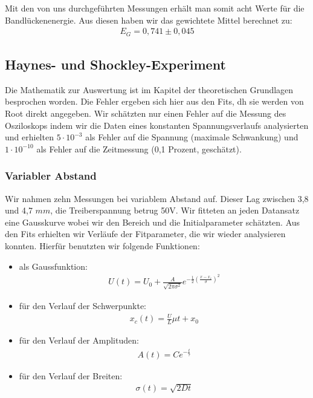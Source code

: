 \documentclass[12pt]{article}
\begin{document}
Mit den von uns durchgeführten Messungen erhält man somit acht Werte für die Bandlückenenergie. Aus diesen haben wir das gewichtete Mittel berechnet zu:
\begin{align*}
 E_G = 0,741 \pm 0,045
\end{align*}

\subsection{Haynes- und Shockley-Experiment}
\captionfont\footnotesize
Die Mathematik zur Auswertung ist im Kapitel der theoretischen Grundlagen besprochen worden. Die Fehler ergeben sich hier aus den Fits, dh sie werden von Root direkt angegeben. Wir schätzten nur einen Fehler auf die Messung des Osziloskops indem wir die Daten eines konstanten Spannungsverlaufs analysierten und erhielten $5 \cdot 10^{-3}$ als Fehler auf die Spannung (maximale Schwankung) und $1 \cdot 10^{-10}$ als Fehler auf die Zeitmessung (0,1 Prozent, geschätzt).

\subsubsection{Variabler Abstand}
 Wir nahmen zehn Messungen bei variablem Abstand auf. Dieser Lag zwischen 3,8 und 4,7 $mm$, die Treiberspannung betrug 50V. Wir fitteten an jeden Datansatz eine Gausskurve wobei wir den Bereich und die Initialparameter schätzten. Aus den Fits erhielten wir Verläufe der Fitparameter, die wir wieder analysieren konnten. Hierfür benutzten wir folgende Funktionen:
\begin{itemize}
 \item als Gaussfunktion: 
\begin{align*}
U(t) = U_0 + \frac{A}{\sqrt{2\pi \sigma^2}}e^{-\frac{1}{2} \left( \frac{x -x_c}{\sigma}\right)^2 }
\end{align*}
 \item für den Verlauf der Schwerpunkte:
\begin{align*}
x_c(t) = \frac{U}{L} \mu t + x_0
\end{align*}
 \item für den Verlauf der Amplituden:
\begin{align*}
A(t) = C e^{-\frac{t}{\tau}}
\end{align*}
 \item für den Verlauf der Breiten:
\begin{align*}
\sigma(t) = \sqrt{2 D t}
\end{align*}
\end{itemize}
\end{document}
